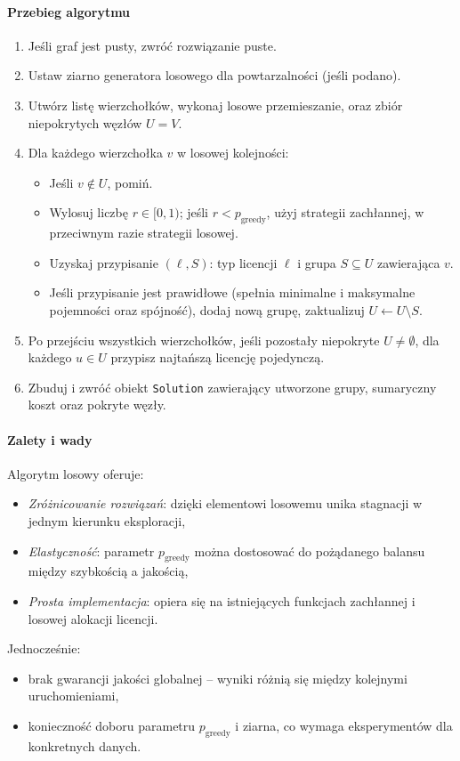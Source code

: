 \paragraph{Przebieg algorytmu}
\begin{enumerate}
  \item Jeśli graf jest pusty, zwróć rozwiązanie puste.
  \item Ustaw ziarno generatora losowego dla powtarzalności (jeśli podano).
  \item Utwórz listę wierzchołków, wykonaj losowe przemieszanie, oraz zbiór niepokrytych węzłów $U=V$.
  \item Dla każdego wierzchołka $v$ w losowej kolejności:
    \begin{itemize}
      \item Jeśli $v\notin U$, pomiń.
      \item Wylosuj liczbę $r\in[0,1)$; jeśli $r<p_\mathrm{greedy}$, użyj strategii zachłannej, w przeciwnym razie strategii losowej.
      \item Uzyskaj przypisanie $(\ell,S)$: typ licencji $\ell$ i grupa $S\subseteq U$ zawierająca $v$.
      \item Jeśli przypisanie jest prawidłowe (spełnia minimalne i maksymalne pojemności oraz spójność), dodaj nową grupę, zaktualizuj $U\leftarrow U\setminus S$.
    \end{itemize}
  \item Po przejściu wszystkich wierzchołków, jeśli pozostały niepokryte $U\neq\emptyset$, dla każdego $u\in U$ przypisz najtańszą licencję pojedynczą.
  \item Zbuduj i zwróć obiekt \texttt{Solution} zawierający utworzone grupy, sumaryczny koszt oraz pokryte węzły.
\end{enumerate}

\paragraph{Zalety i wady}  
Algorytm losowy oferuje:
\begin{itemize}
  \item \emph{Zróżnicowanie rozwiązań}: dzięki elementowi losowemu unika stagnacji w jednym kierunku eksploracji,
  \item \emph{Elastyczność}: parametr $p_\mathrm{greedy}$ można dostosować do pożądanego balansu między szybkością a jakością,
  \item \emph{Prosta implementacja}: opiera się na istniejących funkcjach zachłannej i losowej alokacji licencji.
\end{itemize}
Jednocześnie:
\begin{itemize}
  \item brak gwarancji jakości globalnej – wyniki różnią się między kolejnymi uruchomieniami,
  \item konieczność doboru parametru $p_\mathrm{greedy}$ i ziarna, co wymaga eksperymentów dla konkretnych danych.
\end{itemize}

